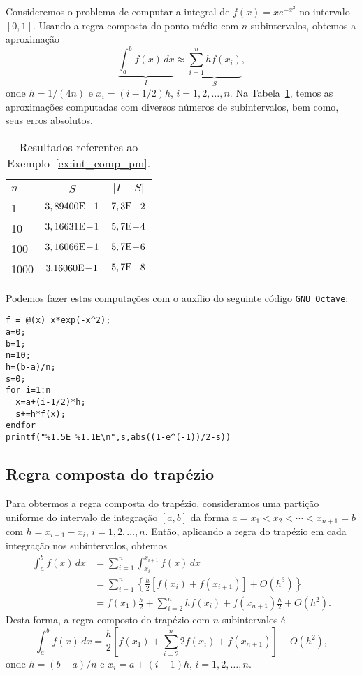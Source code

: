 \begin{ex}\label{ex:int_comp_pm}
  Consideremos o problema de computar a integral de $f(x)=xe^{-x^2}$ no intervalo $[0, 1]$. Usando a regra composta do ponto médio com $n$ subintervalos, obtemos a aproximação
  \begin{equation}
    \underbrace{\int_a^b f(x)\,dx}_{I} \approx \underbrace{\sum_{i=1}^n hf(x_i)}_{S},
  \end{equation}
onde $h=1/(4n)$ e $x_i = (i-1/2)h$, $i=1, 2, \dotsc, n$. Na Tabela~\ref{tab:ex_int_comp_pm}, temos as aproximações computadas com diversos números de subintervalos, bem como, seus erros absolutos.

\begin{table}[h!]
  \centering
  \caption{Resultados referentes ao Exemplo~\ref{ex:int_comp_pm}.}
  \begin{tabular}{l|cc}
    $n$ & $S$ & $|I-S|$ \\\hline
    1   & $3,89400\mathrm{E}\!-\!1$ & $7,3\mathrm{E}\!-\!2$ \\
    10  & $3,16631\mathrm{E}\!-\!1$ & $5,7\mathrm{E}\!-\!4$ \\
    100 & $3,16066\mathrm{E}\!-\!1$ & $5,7\mathrm{E}\!-\!6$ \\
    1000& $3.16060\mathrm{E}\!-\!1$ & $5,7\mathrm{E}\!-\!8$ \\\hline
  \end{tabular}
  \label{tab:ex_int_comp_pm}
\end{table}

\ifisoctave
Podemos fazer estas computações com o auxílio do seguinte código \verb+GNU Octave+:
\begin{verbatim}
f = @(x) x*exp(-x^2);
a=0;
b=1;
n=10;
h=(b-a)/n;
s=0;
for i=1:n
  x=a+(i-1/2)*h;
  s+=h*f(x);
endfor
printf("%1.5E %1.1E\n",s,abs((1-e^(-1))/2-s))
\end{verbatim}
\fi
\end{ex}

\subsection{Regra composta do trapézio}

Para obtermos a regra composta do trapézio, consideramos uma partição uniforme do intervalo de integração $[a, b]$ da forma $a=x_1 < x_2 < \cdots < x_{n+1}=b$ com $h=x_{i+1}-x_{i}$, $i=1, 2, \dotsc, n$. Então, aplicando a regra do trapézio em cada integração nos subintervalos, obtemos
\begin{align}
  \int_a^bf(x)\,dx &= \sum_{i=1}^n \int_{x_i}^{x_{i+1}} f(x)\,dx\\
  &= \sum_{i=1}^n \left\{\frac{h}{2}\left[f(x_i)+f(x_{i+1})\right] + O(h^3)\right\}\\
  &= f(x_1)\frac{h}{2} + \sum_{i=2}^{n} hf(x_i) + f(x_{n+1})\frac{h}{2} + O(h^2). 
\end{align}
Desta forma, a regra composto do trapézio com $n$ subintervalos é
\begin{equation}
  \int_a^b f(x)\,dx = \frac{h}{2}\left[f(x_1) + \sum_{i=2}^{n} 2f(x_i) + f(x_{n+1})\right] + O(h^2),
\end{equation}
onde $h=(b-a)/n$ e $x_i = a + (i-1)h$, $i=1, 2, \dotsc, n$.

